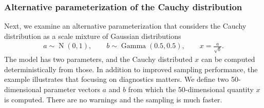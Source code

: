 \documentclass[american,]{article}
\DeclareMathOperator{\N}{N}
\DeclareMathOperator{\Gam}{Gamma}
\theoremstyle{definition}
\begin{document}
\hypertarget{alternative-parameterization-of-the-cauchy-distribution}{%
\subsubsection*{Alternative parameterization of the
Cauchy distribution}\label{alternative-parameterization-of-the-cauchy-distribution}}

Next, we examine an alternative parameterization that considers the
Cauchy distribution as a scale mixture of Gaussian distributions
\begin{align}
  a \sim  \N(0,1), \qquad
  b \sim  \Gam (0.5, 0.5), \qquad
  x =  \frac{a}{\sqrt{b}}.
\end{align}
The model has two parameters, and the Cauchy distributed \(x\) can be
computed deterministically from those. In addition to improved sampling 
performance, the example illustrates that focusing on diagnostics matters.
We define two 50-dimensional parameter vectors $a$ and $b$ from which
the 50-dimensional quantity $x$ is computed. There are no warnings and
the sampling is much faster.

\end{document}
